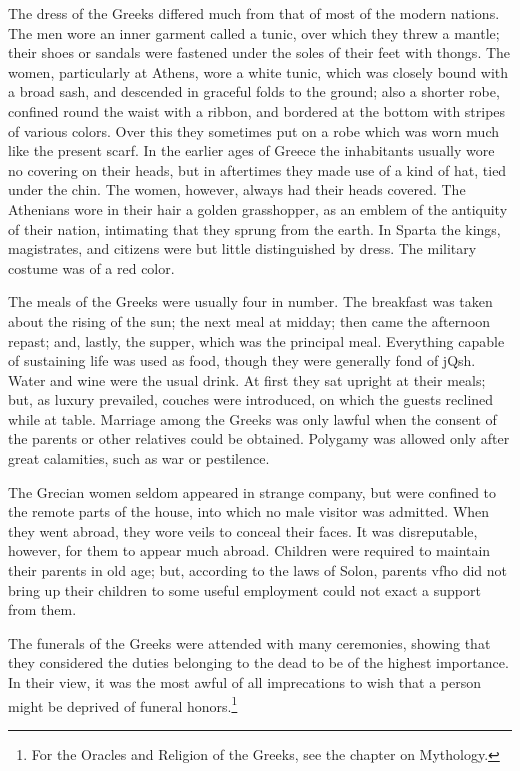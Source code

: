 \documentclass[openany,a4paper]{memoir}
\begin{document}
The dress of the Greeks differed much from that of most of the modern nations. The 
men wore an inner garment called a tunic, over which they 
threw a mantle; their shoes or sandals were fastened under 
the soles of their feet with thongs. The women, particularly at Athens, wore a white tunic, which was closely bound 
with a broad sash, and descended in graceful folds to the 
ground; also a shorter robe, confined round the waist with 
a ribbon, and bordered at the bottom with stripes of various 
colors. Over this they sometimes put on a robe which was 
worn much like the present scarf. In the earlier ages of 
Greece the inhabitants usually wore no covering on their 
heads, but in aftertimes they made use of a kind of hat, 
tied under the chin. The women, however, always had 
their heads covered. The Athenians wore in their hair a 
golden grasshopper, as an emblem of the antiquity of their 
nation, intimating that they sprung from the earth. In 
Sparta the kings, magistrates, and citizens were but little 
distinguished by dress. The military costume was of a red 
color. 

The meals of the Greeks were usually four in number. 
The breakfast was taken about the rising of the sun; the 
next meal at midday; then came the afternoon repast; and, 
lastly, the supper, which was the principal meal. Everything capable of sustaining life was used as food, though 
they were generally fond of jQsh. Water and wine were the 
usual drink. At first they sat upright at their meals; but, 
as luxury prevailed, couches were introduced, on which the 
guests reclined while at table. Marriage among the Greeks 
was only lawful when the consent of the parents or other 
relatives could be obtained. Polygamy was allowed only 
after great calamities, such as war or pestilence. 

The Grecian women seldom appeared in strange company, 
but were confined to the remote parts of the house, into 
which no male visitor was admitted. When they went 
abroad, they wore veils to conceal their faces. It was disreputable, however, for them to appear much abroad. Children were required to maintain their parents in old age; but, 
according to the laws of Solon, parents vfho did not bring 
up their children to some useful employment could not exact a support from them. 

The funerals of the Greeks were attended with many ceremonies, showing that they considered the duties belonging 
to the dead to be of the highest importance. In their view, 
it was the most awful of all imprecations to wish that a 
person might be deprived of funeral honors.\footnote{For the Oracles and Religion of the Greeks, see the chapter on 
Mythology.} 
\end{document}

